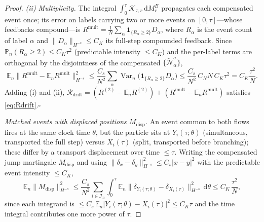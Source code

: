 \documentclass[a4paper,fleqn]{cas-sc}
\theoremstyle{definition}
\theoremstyle{remark}
\begin{document}
\begin{proof}
\emph{(ii) Multiplicity.} The integral $\int_0^\tau\mathcal K_{\tau,r}\,\mathrm dM^B_r$
propagates each compensated event once; its error on labels carrying two or more
events on $[0,\tau]$—whose feedbacks compound—is
$R^{\mathrm{mult}}=\frac1N\sum_\alpha\mathbf 1_{\{R_\alpha\ge2\}}D_\alpha$, where
$R_\alpha$ is the event count of label $\alpha$ and $\|D_\alpha\|_{H^{-s}}\le C_K$ its
full-step compounded feedback. Since $\mathbb P_n(R_\alpha\ge2)\le C_K\tau^2$
(predictable intensity $\le C_K$) and the per-label terms are orthogonal by the
disjointness of the compensated $\{\widetilde{\mathcal N}^\sigma_\alpha\}$,
\[
\mathbb E_n\|R^{\mathrm{mult}}-\mathbb E_nR^{\mathrm{mult}}\|_{H^{-s}}^2
\le\frac{C_s}{N^2}\sum_{\alpha}\operatorname{Var}_n\!\bigl(\mathbf 1_{\{R_\alpha\ge2\}}D_\alpha\bigr)
\le\frac{C_s}{N^2}\,C_NN\,C_K\tau^2=C_K\frac{\tau^2}{N}.
\]
Adding (i) and (ii),
$\mathcal R_{\mathrm{drift}}=(R^{(2)}-\mathbb E_nR^{(2)})+(R^{\mathrm{mult}}-\mathbb E_nR^{\mathrm{mult}})$
satisfies \eqref{eq:Rdrift}.\hfill$\square$

\emph{Matched events with displaced positions $M_{\mathrm{disp}}$.} An event
common to both flows fires at the same clock time $\theta$, but the particle sits
at $Y_i(\tau;\theta)$ (simultaneous, transported the full step) versus $X_i(\tau)$
(split, transported before branching); these differ by a transport displacement
over time $\le\tau$. Writing the compensated jump martingale $M_{\mathrm{disp}}$
and using $\|\delta_x-\delta_y\|_{H^{-s}}^2\le C_s|x-y|^2$ with the predictable
event intensity $\le C_K$,
\[
\mathbb E_n\|M_{\mathrm{disp}}\|_{H^{-s}}^2
\le\frac{C_s}{N^2}\sum_{i\in\mathcal I_n}\int_0^\tau
\mathbb E_n\|\delta_{Y_i(\tau;\theta)}-\delta_{X_i(\tau)}\|_{H^{-s}}^2\,\mathrm d\theta
\le C_K\,\frac{\tau^2}{N},
\]
since each integrand is $\le C_s\,\mathbb E_n|Y_i(\tau;\theta)-X_i(\tau)|^2\le C_K\tau$
and the time integral contributes one more power of $\tau$.


\end{proof}
\end{document}
